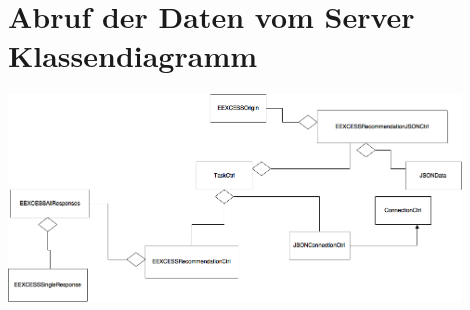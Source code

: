 \section{Abruf der Daten vom Server Klassendiagramm}

\includegraphics[width=12cm]{Pics/Klassendiagramm_Anfrage}

